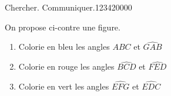 \begin{pageAD} 


\begin{ExoCad}{Chercher. Communiquer.}{1234}{2}{0}{0}{0}{0}

\begin{minipage}{0.5\linewidth}
On propose ci-contre une figure.
\begin{enumerate}
\item Colorie en bleu les angles $\widehat{ABC}$ et  $\widehat{GAB}$
\item Colorie en rouge les angles $\widehat{BCD}$ et  $\widehat{FED}$
\item Colorie en vert les angles $\widehat{EFG}$ et  $\widehat{EDC}$
\end{enumerate}

\end{minipage}
\begin{minipage}{0.5\linewidth}


\end{minipage}
\end{ExoCad}
\end{pageAD}

